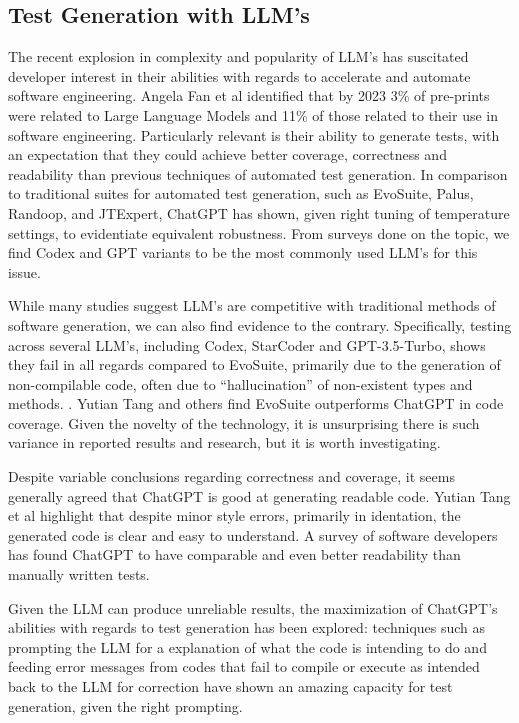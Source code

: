 \subsection{Test Generation with LLM's}

The recent explosion in complexity and popularity of LLM's has suscitated developer interest in their abilities with regards to accelerate and automate software engineering. Angela Fan et al identified that by 2023 3\% of pre-prints were related to Large Language Models and 11\% of those related to their use in software engineering\cite{kn:angela}. Particularly relevant is their ability to generate tests, with an expectation that they could achieve better coverage, correctness and readability than previous techniques of automated test generation\cite{kn:junjiewang}.
In comparison to traditional suites for automated test generation, such as EvoSuite, Palus, Randoop, and JTExpert, ChatGPT has shown, given right tuning of temperature settings, to evidentiate equivalent robustness\cite{kn:gptunitbra}.
From surveys done on the topic, we find Codex and GPT variants to be the most commonly used LLM's for this issue\cite{kn:junjiewang}.

While many studies suggest LLM's are competitive with traditional methods of software generation, we can also find evidence to the contrary. Specifically, testing across several LLM's, including Codex, StarCoder and GPT-3.5-Turbo, shows they fail in all regards compared to EvoSuite, primarily due to the generation of non-compilable code, often due to ``hallucination'' of non-existent types and methods. \citep{kn:siddiq2023empirical}. Yutian Tang and others find EvoSuite outperforms ChatGPT in code coverage\citep{kn:tang2023chatgpt}. Given the novelty of the technology, it is unsurprising there is such variance in reported results and research, but it is worth investigating.

Despite variable conclusions regarding correctness and coverage, it seems generally agreed that ChatGPT is good at generating readable code. Yutian Tang et al highlight that despite minor style errors, primarily in identation, the generated code is clear and easy to understand\citep{kn:tang2023chatgpt}. A survey of software developers has found ChatGPT to have comparable and even better readability than manually written tests\citep{kn:chattester}.


Given the LLM can produce unreliable results, the maximization of ChatGPT's abilities with regards to test generation has been explored: techniques such as prompting the LLM for a explanation of what the code is intending to do \cite{kn:nuances} and feeding error messages from codes that fail to compile or execute as intended back to the LLM for correction \cite{kn:chattester} have shown an amazing capacity for test generation, given the right prompting.

